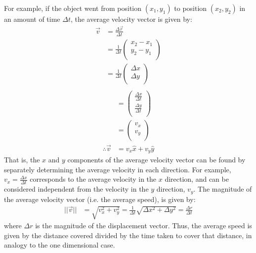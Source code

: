 For example, if the object went from position $(x_1,y_1)$ to position $(x_2,y_2)$ in an amount of time $\Delta t$, the average velocity vector is given by:
\begin{align*}
\vec v &= \frac{\Delta \vec r}{\Delta t}\\
&=\frac{1}{\Delta t}\begin{pmatrix}
           x_2-x_1 \\
           y_2-y_1 \\
         \end{pmatrix}\\
 &=\frac{1}{\Delta t}\begin{pmatrix}
           \Delta x \\
           \Delta y \\
         \end{pmatrix}\\     
\end{align*}
\begin{align*}
 &=\begin{pmatrix}
           \frac{\Delta x}{\Delta t} \\
           \frac{\Delta y}{\Delta t}\\
         \end{pmatrix}\\       
 &=\begin{pmatrix}
           v_x \\
           v_y \\
         \end{pmatrix}\\    
\therefore \vec v &= v_x\hat x+v_y\hat y                     
\end{align*}
That is, the $x$ and $y$ components of the average velocity vector can be found by separately determining the average velocity in each direction. For example, $v_x=\frac{\Delta x}{\Delta t}$ corresponds to the average velocity in the $x$ direction, and can be considered independent from the velocity in the $y$ direction, $v_y$. The magnitude of the average velocity vector (i.e. the average speed), is given by:
\begin{align*}
||\vec v||&=\sqrt{v_x^2+v_y^2}=\frac{1}{\Delta t}\sqrt{\Delta x^2+\Delta y^2}=\frac{\Delta r}{\Delta t}
\end{align*}
where $\Delta r$ is the magnitude of the displacement vector. Thus, the average speed is given by the distance covered divided by the time taken to cover that distance, in analogy to the one dimensional case.

